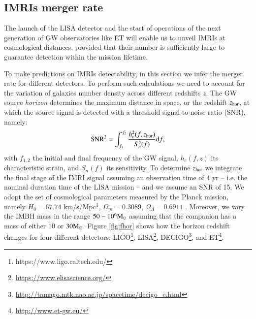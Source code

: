 \documentclass[article]{aa}
\newcommand{\Ms}{{\rm M}_\odot}
\begin{document}
\subsection{IMRIs merger rate}

The launch of the LISA detector and the start of operations of the next generation of GW observatories like ET will enable us to unveil IMRIs at cosmological distances, provided that their number is sufficiently large to guarantee detection within the mission lifetime. 

To make predictions on IMRIs detectability, in this section we infer the merger rate for different detectors. To perform such calculations we need to account for the variation of galaxies number density across different redshifts $z$.
The GW source {\it horizon} determines the maximum distance in space, or the redshift $z_{\rm hor}$, at which the source signal is detected with a threshold signal-to-noise ratio (SNR), namely:
\begin{equation}
{\rm SNR^2} = \int_{f_1}^{f_2} \displaystyle{\frac{h_c^2(f,z_{\rm hor})}{S_n^2(f)}} {\rm d}f,
\end{equation}
with $f_{1,2}$ the initial and final frequency of the GW signal, $h_c(f,z)$ its characteristic strain, and $S_n(f)$ its sensitivity. To determine $z_{\rm hor}$ we integrate the final stage of the IMRI signal assuming an observation time of 4 yr -- i.e. the nominal duration time of the LISA mission -- and we assume an SNR of 15. We adopt the set of cosmological parameters measured by the Planck mission, namely $H_0 = 67.74$ km/s/Mpc$^{3}$, $\Omega_m = 0.3089$, $\Omega_\Lambda = 0.6911$ \citep{planck15}. Moreover, we vary the IMBH mass in the range $50-10^6\Ms$ assuming that the companion has a mass of either $10$ or $30\Ms$. Figure \ref{fig:fhor} shows how the horizon redshift changes for four different detectors: LIGO\footnote{https://www.ligo.caltech.edu/}, LISA\footnote{\url{https://www.elisascience.org/}}, DECIGO\footnote{\url{http://tamago.mtk.nao.ac.jp/spacetime/decigo_e.html}}, and ET\footnote{\url{http://www.et-gw.eu/}}. 
\end{document}
